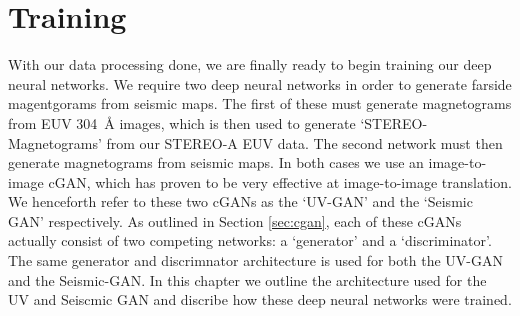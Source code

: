 \documentclass[11pt,a4paper,onecolumn]{report}
\begin{document}
%
%
%
%
%
%
%
%
\chapter{Training}
\label{chap:training}
%
%
%
%
%
%
%
%
With our data processing done, we are finally ready to begin training our deep
neural networks.
We require two deep neural networks in order to generate farside magentgorams
from seismic maps. The first of these must generate magnetograms from EUV
\SI{304}{\angstrom} images, which is then used to generate `STEREO-Magnetograms'
from our STEREO-A EUV data. The second network must then generate magnetograms
from seismic maps. In both cases we use an image-to-image cGAN, which has proven
to be very effective at image-to-image translation. We henceforth refer to these
two cGANs as the `UV-GAN' and the `Seismic GAN' respectively. As outlined in
Section \ref{sec:cgan}, each of these cGANs actually consist of two competing
networks: a `generator' and a `discriminator'. The same generator and
discrimnator architecture is used for both the UV-GAN and the Seismic-GAN. In
this chapter we outline the architecture used for the UV and Seiscmic GAN and
discribe how these deep neural networks were trained.



  
\end{document}

